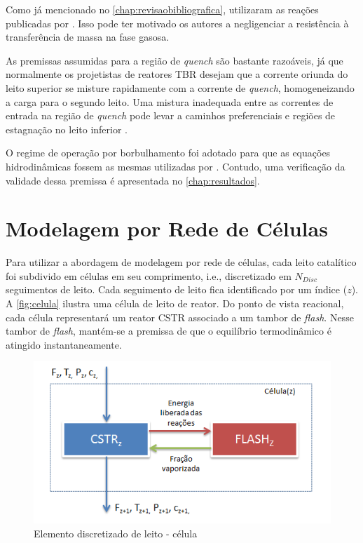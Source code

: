 Como já mencionado no \autoref{chap:revisaobibliografica},
 utilizaram as reações publicadas por
. Isso pode ter motivado os autores a negligenciar a
resistência à transferência de massa na fase gasosa.

As premissas assumidas para a região de \emph{quench} são bastante razoáveis, já
que normalmente os projetistas de reatores TBR desejam que a corrente oriunda do
leito superior se misture rapidamente com a corrente de \emph{quench},
homogeneizando a carga para o segundo leito. Uma mistura inadequada entre as
correntes de entrada na região de \emph{quench} pode levar a caminhos
preferenciais e regiões de estagnação no leito inferior \cite{Ancheyta2011}.

O regime de operação por borbulhamento foi adotado para que as
equações hidrodinâmicas fossem as mesmas utilizadas por .
Contudo, uma verificação da validade dessa premissa é apresentada no
\autoref{chap:resultados}.

\section{Modelagem por Rede de Células} \label{sec:modelagemredecelulas}

Para utilizar a abordagem de modelagem por rede de células, cada leito
catalítico foi subdivido em células em seu comprimento, i.e., discretizado em
$N_{Disc}$ seguimentos de leito. Cada seguimento de leito fica identificado por
um índice ($z$). A \autoref{fig:celula} ilustra uma célula de leito de
reator. Do ponto de vista reacional, cada célula representará um reator CSTR
associado a um tambor de \emph{flash}. Nesse tambor de \emph{flash}, mantém-se a
premissa de que o equilíbrio termodinâmico é atingido instantaneamente.

 \begin{figure}[htb]
 \centering \includegraphics[scale=0.75]{images/Chap3/celula.png}
 \caption{Elemento discretizado de leito - célula}
 \label{fig:celula}
 \end{figure}


